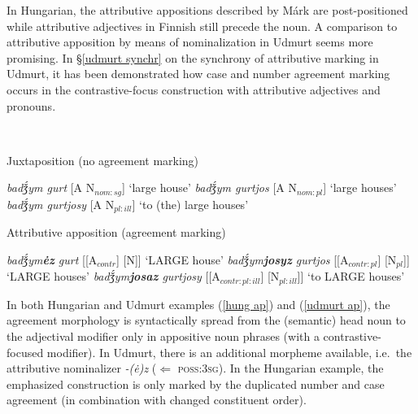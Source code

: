 {In Hungarian, the attributive appositions described by Márk are post-positioned while attributive adjectives in Finnish still precede the noun. A comparison to attributive apposition by means of nominalization in Udmurt seems more promising. In \S\ref{udmurt synchr} on the synchrony of attributive marking in Udmurt, it has been demonstrated how case and number agreement marking occurs in the contrastive-focus construction with attributive adjectives and pronouns.
\begin{exe} \label{udmurt ap}
\ex {}\\
\begin{xlist}
\ex 	Juxtaposition (no agreement marking)
\begin{xlist}
\ex	\textit{badǯ́ym gurt} [A N$_{nom:sg}$] ‘large house’
\ex	\textit{badǯ́ym gurtjos} [A N$_{nom:pl}$] ‘large houses’
\ex	\textit{badǯ́ym gurtjosy} [A N$_{pl:ill}$] ‘to (the) large houses’
\end{xlist}
\ex	Attributive apposition (agreement marking)
\begin{xlist}
\ex	\textit{badǯ́ym\textbf{ėz} gurt} [[A$_{contr}$] [N]] ‘LARGE house’
\ex	\textit{badǯ́ym\textbf{josyz} gurtjos} [[A$_{contr:pl}$] [N$_{pl}$]] ‘LARGE houses’
\ex	\textit{badǯ́ym\textbf{josaz} gurtjosy} [[A$_{contr:pl:ill}$] [N$_{pl:ill}$]] ‘to LARGE houses’
\end{xlist}
\end{xlist}
\end{exe}
In both Hungarian and Udmurt examples (\ref{hung ap}) and (\ref{udmurt ap}), the agreement morphology is syntactically spread from the (semantic) head noun to the adjectival modifier only in appositive noun phrases (with a contrastive-focused modifier). In Udmurt, there is an additional morpheme available, i.e.~the attributive nominalizer \textit{-(ė)z} ($\Leftarrow$ \textsc{poss:3sg}). In the Hungarian example, the emphasized construction is only marked by the duplicated number and case agreement (in combination with changed constituent order).

}

